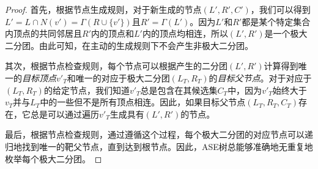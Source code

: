 \begin{proof}
  首先，根据节点生成规则，对于新生成的节点$(L',R',C')$，我们可以得到$L'=L\cap N(v')=\Gamma(R\cup\{v'\})$且$R'=\Gamma(L')$。因为$L'$和$R'$都是某个特定集合内顶点的共同邻居且$R'$内的顶点和$L'$内的顶点均相连，所以$(L',R')$是一个极大二分团。由此可知，在主动的生成规则下不会产生非极大二分团。

  其次，根据节点检查规则，每个节点可以根据产生的二分团$(L',R')$计算得到唯一的\emph{目标顶点$v'_T$}和唯一的对应于极大二分团$(L_T, R_T)$的\emph{目标父节点}。对于对应于$(L_T, R_T)$的给定节点，我们知道$v'_T$总是包含在其候选集$C_T$中，因为$v'_T$始终大于$v_T$并与$L_T$中的一些但不是所有顶点相连。因此，如果目标父节点$(L_T,R_T,C_T)$存在，它总是可以通过遍历$v'_T$生成具有$(L', R')$的节点。
  
  
  
  最后，根据节点检查规则，通过遵循这个过程，每个极大二分团的对应节点可以递归地找到唯一的靶父节点，直到达到根节点。因此，ASE树总能够准确地无重复地枚举每个极大二分团。
\end{proof}





